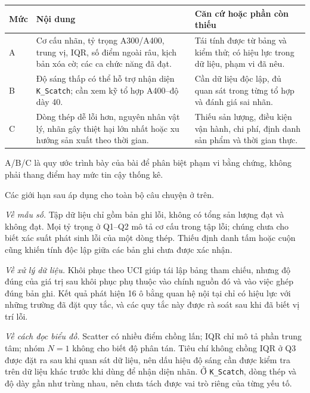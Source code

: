 \documentclass[12pt,a4paper,oneside]{report}
\newcommand{\maCot}[1]{{\urlstyle{tt}\def\UrlBreaks{\do\_\do\/\do\.}\def\UrlBigBreaks{}\nolinkurl{#1}}}
\begin{document}
\begin{center}\begin{minipage}{\linewidth}
\label{tab:ch4bangchung}
\small{}
\begin{tabularx}{\linewidth}{@{}p{0.8cm}Y Y@{}}
\toprule
Mức & Nội dung & Căn cứ hoặc phần còn thiếu \\
\midrule
A & Cơ cấu nhãn, tỷ trọng A300/A400, trung vị, IQR, số điểm ngoài râu, kịch bản xóa cờ; các ca chức năng đã đạt. & Tái tính được từ bảng và kiểm thử; có hiệu lực trong dữ liệu, phạm vi đã nêu. \\
B & Độ sáng thấp có thể hỗ trợ nhận diện \maCot{K_Scatch}; cần xem kỹ tổ hợp A400--độ dày 40. & Cần dữ liệu độc lập, đủ quan sát trong từng tổ hợp và đánh giá sai nhãn. \\
C & Dòng thép dễ lỗi hơn, nguyên nhân vật lý, nhãn gây thiệt hại lớn nhất hoặc xu hướng sản xuất theo thời gian. & Thiếu sản lượng, điều kiện vận hành, chi phí, định danh sản phẩm và thời gian thực. \\
\bottomrule
\end{tabularx}
\smallskip
\par\raggedright\footnotesize A/B/C là quy ước trình bày của bài để phân biệt phạm vi bằng chứng, không phải thang điểm hay mức tin cậy thống kê.
\end{minipage}\end{center}

Các giới hạn sau áp dụng cho toàn bộ câu chuyện ở trên.

\emph{Về mẫu số.} Tập dữ liệu chỉ gồm bản ghi lỗi, không có tổng sản lượng đạt và không đạt. Mọi tỷ trọng ở Q1--Q2 mô tả cơ cấu trong tập lỗi; chúng chưa cho biết xác suất phát sinh lỗi của một dòng thép. Thiếu định danh tấm hoặc cuộn cũng khiến tính độc lập giữa các bản ghi chưa được xác nhận.

\emph{Về xử lý dữ liệu.} Khôi phục theo UCI giúp tái lập bảng tham chiếu, nhưng độ đúng của giá trị sau khôi phục phụ thuộc vào chính nguồn đó và vào việc ghép đúng bản ghi. Kết quả phát hiện 16 ô bằng quan hệ nội tại chỉ có hiệu lực với những trường đã đặt quy tắc, và các quy tắc này được rà soát sau khi đã biết vị trí lỗi.

\emph{Về cách đọc biểu đồ.} Scatter có nhiều điểm chồng lấn; IQR chỉ mô tả phần trung tâm; nhóm $N=1$ không cho biết độ phân tán. Tiêu chí không chồng IQR ở Q3 được đặt ra sau khi quan sát dữ liệu, nên dấu hiệu độ sáng cần được kiểm tra trên dữ liệu khác trước khi dùng để nhận diện nhãn. Ở \maCot{K_Scatch}, dòng thép và độ dày gần như trùng nhau, nên chưa tách được vai trò riêng của từng yếu tố.
\end{document}
